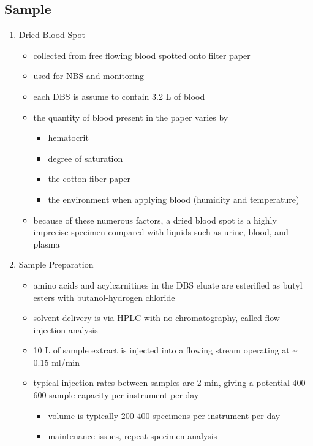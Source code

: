 \documentclass{scrartcl}
\begin{document}
\subsection{Sample}
\label{sec:orgeb71a27}
\begin{enumerate}
\item Dried Blood Spot
\label{sec:org7c8fb94}
\begin{itemize}
\item collected from free flowing blood spotted onto filter paper
\item used for NBS and monitoring
\item each DBS is assume to contain 3.2 \textmu{}L of blood
\item the quantity of blood present in the paper varies by
\begin{itemize}
\item hematocrit
\item degree of saturation
\item the cotton fiber paper
\item the environment  when applying blood (humidity and temperature)
\end{itemize}
\item because of these numerous factors, a dried blood spot is a highly
imprecise specimen compared with liquids such as urine, blood, and plasma
\end{itemize}

\item Sample Preparation
\label{sec:org0488361}
\begin{itemize}
\item amino acids and acylcarnitines in the DBS eluate are esterified as butyl esters with butanol-hydrogen chloride
\item solvent delivery is via HPLC with no chromatography, called flow injection analysis
\item 10 \textmu{}L of sample extract is injected into a flowing stream operating at \textasciitilde{} 0.15 ml/min

\item typical injection rates between samples are 2 min, giving a
potential 400-600 sample capacity per instrument per day
\begin{itemize}
\item volume is typically 200-400 specimens per instrument per day
\item maintenance issues, repeat specimen analysis
\end{itemize}
\end{itemize}


\end{enumerate}
\end{document}
